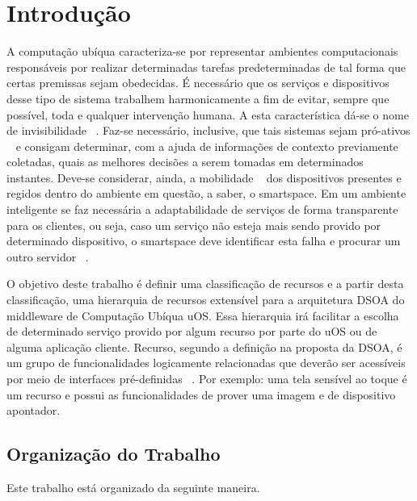 \chapter{Introdução}

A computação ubíqua caracteriza-se por representar ambientes computacionais responsáveis por realizar determinadas tarefas predeterminadas de tal forma que certas premissas sejam obedecidas. É necessário que os serviços e dispositivos desse tipo de sistema trabalhem harmonicamente a fim de evitar, sempre que possível, toda e qualquer intervenção humana. A esta característica dá-se o nome de invisibilidade ~\cite{gomes2007, weiser1993, weiser1999}. Faz-se necessário, inclusive, que tais sistemas sejam pró-ativos ~\cite{gomes2007, buzeto2010} e consigam determinar, com a ajuda de informações de contexto previamente coletadas, quais as melhores decisões a serem tomadas em determinados instantes. Deve-se considerar, ainda, a mobilidade ~\cite{gomes2007, buzeto2010, weiser1999} dos dispositivos presentes e regidos dentro do ambiente em questão, a saber, o smartspace. Em um ambiente inteligente se faz necessária a adaptabilidade de serviços de forma transparente para os clientes, ou seja, caso um serviço não esteja mais sendo provido por determinado dispositivo, o smartspace deve identificar esta falha e procurar um outro servidor ~\cite{gomes2007, passarinho2008, paranhos2009}.

O objetivo deste trabalho é definir uma classificação de recursos e a partir desta classificação, uma hierarquia de recursos extensível para a arquitetura DSOA do middleware de Computação Ubíqua uOS. Essa hierarquia irá facilitar a escolha de determinado serviço provido por algum recurso por parte do uOS ou de alguma aplicação cliente. Recurso, segundo a definição na proposta da DSOA, é um grupo de funcionalidades logicamente relacionadas que deverão ser acessíveis por meio de interfaces pré-definidas ~\cite{buzeto2010}. Por exemplo: uma tela sensível ao toque é um recurso e possui as funcionalidades de prover uma imagem e de dispositivo apontador.

\section{Organização do Trabalho}
Este trabalho está organizado da seguinte maneira.


